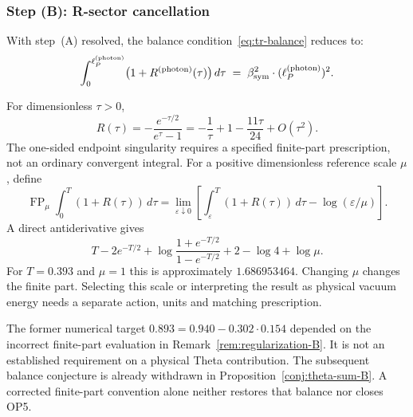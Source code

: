 \subsubsection*{Step (B): R-sector cancellation}

With step~(A) resolved, the balance condition~\eqref{eq:tr-balance}
reduces to:
\begin{equation}
\label{eq:balance-reduced}
 \int_0^{\ell_P^{(\mathrm{photon})}}
 \bigl(1 + R^{(\mathrm{photon})}(\tau)\bigr)\,d\tau
 \;=\; \beta_{\mathrm{sym}}^2\cdot(\ell_P^{(\mathrm{photon})})^2.
\end{equation}

\begin{remark}
\label{rem:regularization-B}
For dimensionless $\tau>0$,
\[
 R(\tau)=-\frac{e^{-\tau/2}}{e^\tau-1}
 =-\frac1\tau+1-\frac{11\tau}{24}+O(\tau^2).
\]
The one-sided endpoint singularity requires a specified finite-part
prescription, not an ordinary convergent integral. For a positive
dimensionless reference scale $\mu$, define
\[
 \operatorname{FP}_{\mu}\int_0^T(1+R(\tau))\,d\tau
 =\lim_{\varepsilon\downarrow0}
 \left[\int_\varepsilon^T(1+R(\tau))\,d\tau
                   -\log(\varepsilon/\mu)\right].
\]
A direct antiderivative gives
\[
 T-2e^{-T/2}+\log\!\frac{1+e^{-T/2}}{1-e^{-T/2}}
       +2-\log4+\log\mu.
\]
For $T=0.393$ and $\mu=1$ this is approximately $1.686953464$.
Changing $\mu$ changes the finite part. Selecting this scale or
interpreting the result as physical vacuum energy needs a separate
action, units and matching prescription.
\end{remark}

\begin{proposition}
\label{prop:theta-required-B}
The former numerical target $0.893=0.940-0.302\cdot0.154$ depended
on the incorrect finite-part evaluation in
Remark~\ref{rem:regularization-B}. It is not an established requirement
on a physical Theta contribution. The subsequent balance conjecture is
already withdrawn in Proposition~\ref{conj:theta-sum-B}.
A corrected finite-part convention alone neither restores that balance
nor closes OP5.
\end{proposition}


